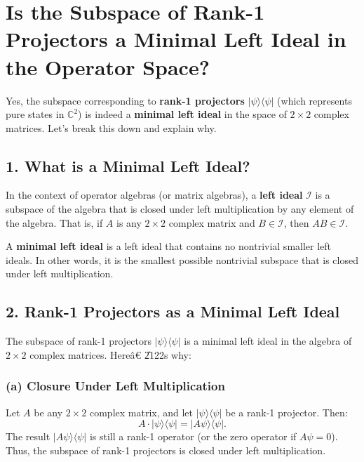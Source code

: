 \documentclass{article}
\begin{document}
\section*{Is the Subspace of Rank-1 Projectors a Minimal Left Ideal in the
Operator Space?}

Yes, the subspace corresponding to \textbf{rank-1 projectors} $|\psi \rangle
\langle \psi |$ (which represents pure states in $\mathbb{C}^{2}$) is indeed
a \textbf{minimal left ideal} in the space of $2\times 2$ complex matrices.
Let's break this down and explain why.

\subsection*{1. What is a Minimal Left Ideal?}

In the context of operator algebras (or matrix algebras), a \textbf{left
ideal} $\mathcal{I} $ is a subspace of the algebra that is closed under left
multiplication by any element of the algebra. That is, if $A $ is any $2
\times 2 $ complex matrix and $B \in \mathcal{I} $, then $AB \in \mathcal{I} 
$.

A \textbf{minimal left ideal} is a left ideal that contains no nontrivial
smaller left ideals. In other words, it is the smallest possible nontrivial
subspace that is closed under left multiplication.

\subsection*{2. Rank-1 Projectors as a Minimal Left Ideal}

The subspace of rank-1 projectors $|\psi\rangle \langle \psi| $ is a minimal
left ideal in the algebra of $2 \times 2 $ complex matrices. Here\^{a}\euro 
\U{2122}s why:

\subsubsection*{(a) Closure Under Left Multiplication}

Let $A $ be any $2 \times 2 $ complex matrix, and let $|\psi\rangle \langle
\psi| $ be a rank-1 projector. Then: 
\begin{equation*}
A \cdot |\psi\rangle \langle \psi| = |A\psi\rangle \langle \psi|. 
\end{equation*}
The result $|A\psi\rangle \langle \psi| $ is still a rank-1 operator (or the
zero operator if $A\psi = 0 $). Thus, the subspace of rank-1 projectors is
closed under left multiplication.
\end{document}

